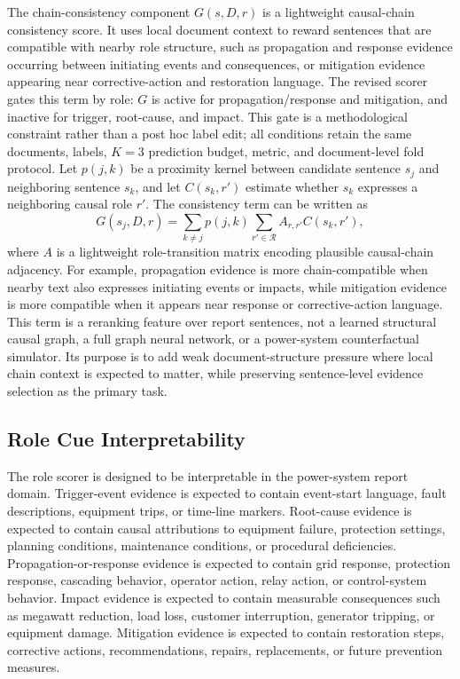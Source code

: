 \documentclass{ieeeaccess}
\begin{document}
The chain-consistency component \(G(s,D,r)\) is a lightweight causal-chain consistency score. It uses local document context to reward sentences that are compatible with nearby role structure, such as propagation and response evidence occurring between initiating events and consequences, or mitigation evidence appearing near corrective-action and restoration language. The revised scorer gates this term by role: \(G\) is active for propagation/response and mitigation, and inactive for trigger, root-cause, and impact. This gate is a methodological constraint rather than a post hoc label edit; all conditions retain the same documents, labels, \(K=3\) prediction budget, metric, and document-level fold protocol. Let \(p(j,k)\) be a proximity kernel between candidate sentence \(s_j\) and neighboring sentence \(s_k\), and let \(C(s_k,r')\) estimate whether \(s_k\) expresses a neighboring causal role \(r'\). The consistency term can be written as
\[
G(s_j,D,r)=
\sum_{k\neq j} p(j,k)
\sum_{r'\in\mathcal{R}} A_{r,r'} C(s_k,r'),
\]
where \(A\) is a lightweight role-transition matrix encoding plausible causal-chain adjacency. For example, propagation evidence is more chain-compatible when nearby text also expresses initiating events or impacts, while mitigation evidence is more compatible when it appears near response or corrective-action language. This term is a reranking feature over report sentences, not a learned structural causal graph, a full graph neural network, or a power-system counterfactual simulator. Its purpose is to add weak document-structure pressure where local chain context is expected to matter, while preserving sentence-level evidence selection as the primary task.

\subsection{Role Cue Interpretability}

\label{sec:role_cue_interpretability}

The role scorer is designed to be interpretable in the power-system report domain. Trigger-event evidence is expected to contain event-start language, fault descriptions, equipment trips, or time-line markers. Root-cause evidence is expected to contain causal attributions to equipment failure, protection settings, planning conditions, maintenance conditions, or procedural deficiencies. Propagation-or-response evidence is expected to contain grid response, protection response, cascading behavior, operator action, relay action, or control-system behavior. Impact evidence is expected to contain measurable consequences such as megawatt reduction, load loss, customer interruption, generator tripping, or equipment damage. Mitigation evidence is expected to contain restoration steps, corrective actions, recommendations, repairs, replacements, or future prevention measures.
\end{document}
